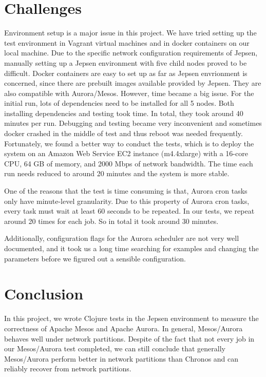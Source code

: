 \documentclass[letterpaper,twocolumn,10pt]{article}
\begin{document}
\section{Challenges}
Environment setup is a major issue in this project. We have tried setting up the test environment in Vagrant virtual machines and in docker containers on our local machine. Due to the specific network configuration requirements of Jepsen, manually setting up a Jepsen environment with five child nodes proved to be difficult. Docker containers are easy to set up as far as Jepsen envrionment is concerned, since there are prebuilt images available provided by Jepsen. They are also compatible with Aurora/Mesos. However, time became a big issue. For the initial run, lots of dependencies need to be installed for all 5 nodes. Both installing dependencies and testing took time. In total, they took around 40 minutes per run. Debugging and testing became very inconvenient and sometimes docker crashed in the middle of test and thus reboot was needed frequently. Fortunately, we found a better way to conduct the tests, which is to deploy the system on an Amazon Web Service EC2 instance (m4.4xlarge) with a 16-core CPU, 64 GB of memory, and 2000 Mbps of network bandwidth. The time each run needs reduced to around 20 minutes and the system is more stable. 

One of the reasons that the test is time consuming is that, Aurora cron tasks only have minute-level granularity. Due to this property of Aurora cron tasks, every task must wait at least 60 seconds to be repeated. In our tests, we repeat around 20 times for each job. So in total it took around 30 minutes. 

Additionally, configuration flags for the Aurora scheduler are not very well documented, and it took us a long time searching for examples and changing the parameters before we figured out a sensible configuration.

\section{Conclusion}
In this project, we wrote Clojure tests in the Jepsen environment to measure the correctness of Apache Mesos and Apache Aurora. In general, Mesos/Aurora behaves well under network partitions. Despite of the fact that not every job in our Mesos/Aurora test completed, we can still conclude that generally Mesos/Aurora perform better in network partitions than Chronos and can reliably recover from network partitions. 
\end{document}
